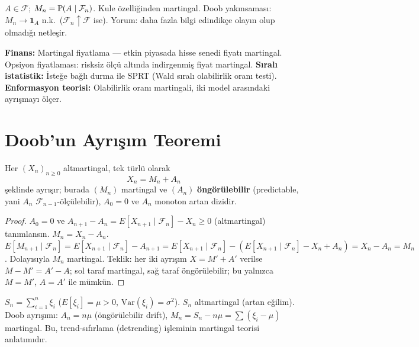 \begin{ornek}
$A\in\mathcal{F}$; $M_n = \mathbb{P}(A\mid\mathcal{F}_n)$. Kule özelliğinden martingal. Doob yakınsaması: $M_n\to\mathbf{1}_A$ n.k.\ ($\mathcal{F}_n\uparrow\mathcal{F}$ ise). Yorum: daha fazla bilgi edindikçe olayın olup olmadığı netleşir.
\end{ornek}

\begin{disiplinlerarasibaglan}
\textbf{Finans:} Martingal fiyatlama --- etkin piyasada hisse senedi fiyatı martingal. Opsiyon fiyatlaması: risksiz ölçü altında indirgenmiş fiyat martingal. \textbf{Sıralı istatistik:} İsteğe bağlı durma ile SPRT (Wald sıralı olabilirlik oranı testi). \textbf{Enformasyon teorisi:} Olabilirlik oranı martingali, iki model arasındaki ayrışmayı ölçer.
\end{disiplinlerarasibaglan}

\section{Doob'un Ayrışım Teoremi}
\label{sec:doob_ayrisim}

\begin{teorem}
\label{thm:doob_ayrisim}
Her $(X_n)_{n\geq0}$ altmartingal, tek türlü olarak
\[
  X_n = M_n + A_n
\]
şeklinde ayrışır; burada $(M_n)$ martingal ve $(A_n)$ \textbf{öngörülebilir}
(predictable, yani $A_n$ $\mathcal{F}_{n-1}$-ölçülebilir), $A_0 = 0$ ve
$A_n$ monoton artan dizidir.
\end{teorem}

\begin{proof}
$A_0 = 0$ ve $A_{n+1} - A_n = E[X_{n+1}\mid\mathcal{F}_n] - X_n \geq 0$ (altmartingal)
tanımlansın. $M_n = X_n - A_n$.
$E[M_{n+1}\mid\mathcal{F}_n] = E[X_{n+1}\mid\mathcal{F}_n] - A_{n+1}
= E[X_{n+1}\mid\mathcal{F}_n] - (E[X_{n+1}\mid\mathcal{F}_n] - X_n + A_n) = X_n - A_n = M_n$.
Dolayısıyla $M_n$ martingal. Teklik: her iki ayrışım $X = M'+A'$ verilse $M-M' = A'-A$;
sol taraf martingal, sağ taraf öngörülebilir; bu yalnızca $M=M'$, $A=A'$ ile mümkün.
\end{proof}

\begin{ornek}
$S_n = \sum_{i=1}^n \xi_i$ ($E[\xi_i] = \mu > 0$, $\mathrm{Var}(\xi_i) = \sigma^2$).
$S_n$ altmartingal (artan eğilim). Doob ayrışımı:
$A_n = n\mu$ (öngörülebilir drift), $M_n = S_n - n\mu = \sum(\xi_i-\mu)$ martingal.
Bu, trend-sıfırlama (detrending) işleminin martingal teorisi anlatımıdır.
\end{ornek}

